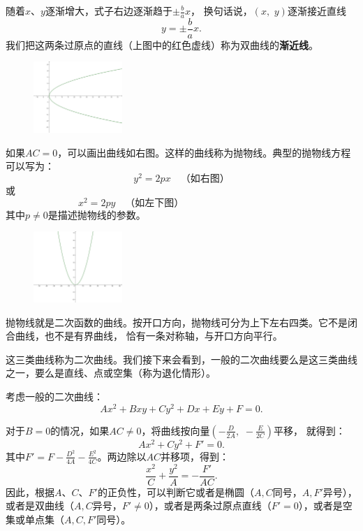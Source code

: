 \documentclass[12pt,UTF8]{ctexbook}
\theoremstyle{definition}
\theoremstyle{plain}
\begin{document}
随着$x$、$y$逐渐增大，式子右边逐渐趋于$\displaystyle\pm \frac{b}{a} x$，
换句话说，$(x, \,\, y)$逐渐接近直线
$$ y = \pm \frac{b}{a}x. $$
我们把这两条过原点的直线（上图中的红色虚线）称为双曲线的\textbf{渐近线}。

\begin{figure} %
    \flushright
    \includegraphics[width=0.3\textwidth]{tu/抛物线1.png}
\end{figure}

如果$AC = 0$，可以画出曲线如右图。这样的曲线称为抛物线。典型的抛物线方程可以写为：
$$ y^2 = 2px  \quad \mbox{（如右图）} $$
或
$$ x^2 = 2py  \quad \mbox{（如左下图）} \qquad  \qquad  \qquad  \qquad\;\;\; \phantom{123}$$
其中$p \neq 0$是描述抛物线的参数。

\begin{figure} %
    \vspace{-30pt}
    \flushright
    \includegraphics[width=0.3\textwidth]{tu/抛物线2.png}
\end{figure}

抛物线就是二次函数的曲线。按开口方向，抛物线可分为上下左右四类。它不是闭合曲线，也不是有界曲线，
恰有一条对称轴，与开口方向平行。

这三类曲线称为二次曲线。我们接下来会看到，一般的二次曲线要么是这三类曲线之一，要么是直线、点或空集（称为退化情形）。

考虑一般的二次曲线：
$$ Ax^2 + Bxy + Cy^2 + Dx + Ey + F = 0.$$

对于$B = 0$的情况，如果$AC\neq 0$，将曲线按向量$\displaystyle\left(-\frac{D}{2A},\,\,-\frac{E}{2C}\right)$平移，
就得到：
$$ Ax^2 + Cy^2 + F' = 0.$$
其中$F' = F - \frac{D^2}{4A} - \frac{E^2}{4C}$。两边除以$AC$并移项，得到：
$$ \frac{x^2}{C} + \frac{y^2}{A} = -\frac{F'}{AC}.$$
因此，根据$A$、$C$、$F'$的正负性，可以判断它或者是椭圆（$A,C$同号，$A,F'$异号），
或者是双曲线（$A,C$异号，$F' \neq 0$），或者是两条过原点直线（$F' = 0$），或者是空集或单点集（$A,C,F'$同号）。
\end{document}
